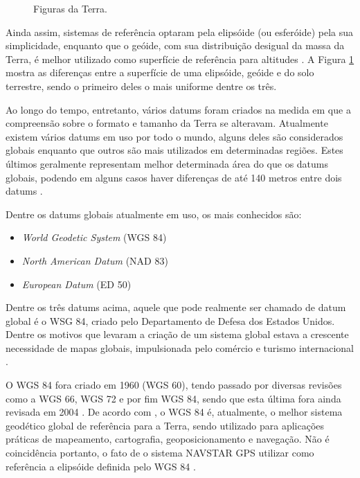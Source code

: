 \documentclass[diss]{template/setrem}
\begin{document}
\begin{figure}[!h]
    \caption{Figuras da Terra.}
    \label{fig:figterra}
\end{figure}

Ainda assim, sistemas de referência optaram pela elipsóide (ou esferóide) pela sua simplicidade, enquanto que o geóide, com sua distribuição desigual da massa da Terra, é melhor utilizado como superfície de referência para altitudes \citep{Torge1991}. A Figura \ref{fig:figterra} mostra as diferenças entre a superfície de uma elipsóide, geóide e do solo terrestre, sendo o primeiro deles o mais uniforme dentre os três.

Ao longo do tempo, entretanto, vários datums foram criados na medida em que a compreensão sobre o formato e tamanho da Terra se alteravam. Atualmente existem vários datums em uso por todo o mundo, alguns deles são considerados globais enquanto que outros são mais utilizados em determinadas regiões. Estes últimos geralmente representam melhor determinada área do que os datums globais, podendo em alguns casos haver diferenças de até 140 metros entre dois datums \citep{Holdener2011}.

Dentre os datums globais atualmente em uso, os mais conhecidos são:
\begin{itemize}
   	\item \emph{World Geodetic System} (WGS 84)
   	\item \emph{North American Datum} (NAD 83)
   	\item \emph{European Datum} (ED 50)
\end{itemize}

Dentre os três datums acima, aquele que pode realmente ser chamado de datum global é o WSG 84, criado pelo Departamento de Defesa dos Estados Unidos. Dentre os motivos que levaram a criação de um sistema global estava a crescente necessidade de mapas globais, impulsionada pelo comércio e turismo internacional \citep{Holdener2011}.

O WGS 84 fora criado em 1960 (WGS 60), tendo passado por diversas revisões como a WGS 66, WGS 72 e por fim WGS 84, sendo que esta última fora ainda revisada em 2004 \citep{Holdener2011}. De acordo com \citet{Nima2000}, o WGS 84 é, atualmente, o melhor sistema geodético global de referência para a Terra, sendo utilizado para aplicações práticas de mapeamento, cartografia, geoposicionamento e navegação. Não é coincidência portanto, o fato de o sistema NAVSTAR GPS utilizar como referência a elipsóide definida pelo WGS 84 \citep{USArmyCorpsofEngineers2003}.
\end{document}
